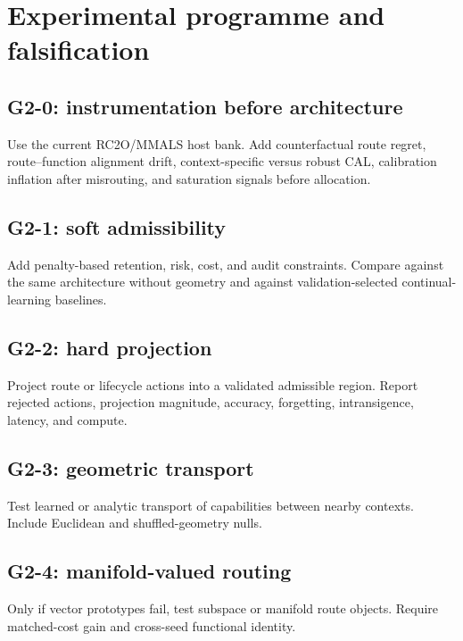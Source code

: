 \documentclass[11pt,a4paper]{article}
\begin{document}
\section{Experimental programme and falsification}
\subsection{G2-0: instrumentation before architecture}
Use the current RC2O/MMALS host bank. Add counterfactual route regret, route--function alignment drift, context-specific versus robust CAL, calibration inflation after misrouting, and saturation signals before allocation.

\subsection{G2-1: soft admissibility}
Add penalty-based retention, risk, cost, and audit constraints. Compare against the same architecture without geometry and against validation-selected continual-learning baselines.

\subsection{G2-2: hard projection}
Project route or lifecycle actions into a validated admissible region. Report rejected actions, projection magnitude, accuracy, forgetting, intransigence, latency, and compute.

\subsection{G2-3: geometric transport}
Test learned or analytic transport of capabilities between nearby contexts. Include Euclidean and shuffled-geometry nulls.

\subsection{G2-4: manifold-valued routing}
Only if vector prototypes fail, test subspace or manifold route objects. Require matched-cost gain and cross-seed functional identity.
\end{document}
